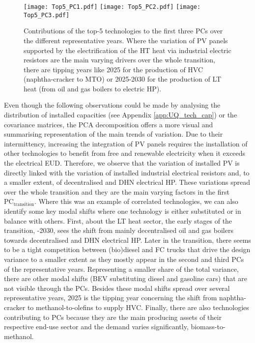 \begin{figure}[!htbp]
\centering
\texttt{[image: Top5\_PC1.pdf]}
\texttt{[image: Top5\_PC2.pdf]}
\texttt{[image: Top5\_PC3.pdf]}
\caption{Contributions of the top-5 technologies to the first three \gls{PCs} over the different representative years. Where the variation of \gls{PV} panels supported by the electrification of the \gls{HT} heat via industrial electric resistors are the main varying drivers over the whole transition, there are tipping years like 2025 for the production of \gls{HVC} (\ie naphtha-cracker to \gls{MTO}) or 2025-2030 for the production of \gls{LT} heat (\ie from oil and gas boilers to electric \gls{HP}).}
\label{fig:Top5_PC_year}
\end{figure}

Even though the following observations could be made by analysing the distribution of installed capacities (see Appendix \ref{app:UQ_tech_cap}) or the covariance matrices, the \gls{PCA} decomposition offers a more visual and summarising representation of the main trends of variation. Due to their intermittency, increasing the integration of \gls{PV} panels requires the installation of other technologies to benefit from free and renewable electricity when it exceeds the electrical \gls{EUD}. Therefore, we observe that the variation of installed \gls{PV} is directly linked with the variation of installed industrial electrical resistors and, to a smaller extent, of decentralised and \gls{DHN} electrical \gls{HP}. These variations spread over the whole transition and they are the main varying factors in the first $\text{PC}_{\text{transition}}$. Where this was an example of correlated technologies, we can also identify some key modal shifts where one technology is either substituted or in balance with others. First, about the \gls{LT} heat sector, the early stages of the transition, -2030, sees the shift from mainly decentralised oil and gas boilers towards decentralised and \gls{DHN} electrical \gls{HP}. Later in the transition, there seems to be a tight competition between (bio)diesel and \gls{FC} trucks that drive the design variance to a smaller extent as they mostly appear in the second and third \gls{PCs} of the representative years. Representing a smaller share of the total variance, there are other modal shifts (\eg \gls{BEV} substituting diesel and gasoline cars) that are not visible through the \gls{PCs}. Besides these modal shifts spread over several representative years, 2025 is the tipping year concerning the shift from naphtha-cracker to methanol-to-olefins to supply \gls{HVC}. Finally, there are also technologies contributing to \gls{PCs} because they are the main producing assets of their respective end-use sector and the demand varies significantly, \eg biomass-to-methanol.

